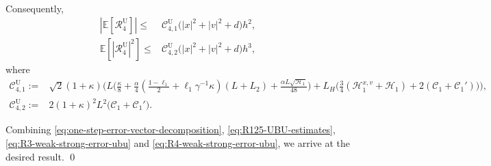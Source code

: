 \documentclass[12pt]{article}
\newenvironment{redtext}
  {\color{black}\ignorespaces}
  {\ignorespacesafterend}
\numberwithin{equation}{section}
\renewenvironment{proof}%
  {\begin{trivlist}%
   \item[]\ignorespaces}%
  {\qed\end{trivlist}}
\newcommand{\E}{\mathbb{E}}
\begin{document}
\begin{redtext}
\begin{proof}
\begin{align}
\end{align}
Consequently,
\begin{equation}\label{eq:R4-weak-strong-error-ubu}
\begin{aligned}
|\E[\mathcal R^{\mathrm{U}}_4]|
\leq&
\mathcal C^{\mathrm{U}}_{4,1}\bigl(
|x|^2+|v|^2+d
\bigr)h^2,
\\
\E[|\mathcal R^{\mathrm{U}}_4|^2]
\leq&
\mathcal C^{\mathrm{U}}_{4,2}
\bigl(
|x|^2+|v|^2+d
\bigr)h^3,
\end{aligned}
\end{equation}
where
\begin{align}
\mathcal C^{\mathrm{U}}_{4,1}
:=&
\sqrt{2}(1+\kappa)
\bigg(
L
\Big(
\tfrac{\kappa}{8}
+
\tfrac{\alpha}{4}
\left(
\tfrac{1-\ell_1}{2}
+
\ell_1\gamma^{-1}\kappa
\right)
(L+L_2)
+
\tfrac{\alpha L\sqrt{\mathscr H_1}}{48}
\Big)
+
L_H
\big(
\tfrac34
\left(
\mathscr H^{x,v}_1+\mathscr H_1
\right)
+
2
\left(
\mathcal C_1+\mathcal C_1'
\right)
\big)
\bigg),
\nonumber\\
\mathcal C^{\mathrm{U}}_{4,2}
:=&
2(1+\kappa)^2
L^2
\bigl(
\mathcal C_1+\mathcal C_1'
\bigr).
\nonumber
\end{align}

Combining \eqref{eq:one-step-error-vector-decomposition},
\eqref{eq:R125-UBU-estimates},
\eqref{eq:R3-weak-strong-error-ubu} and
\eqref{eq:R4-weak-strong-error-ubu}, we arrive at the desired result.
\end{proof}


\end{redtext}


\end{document}
